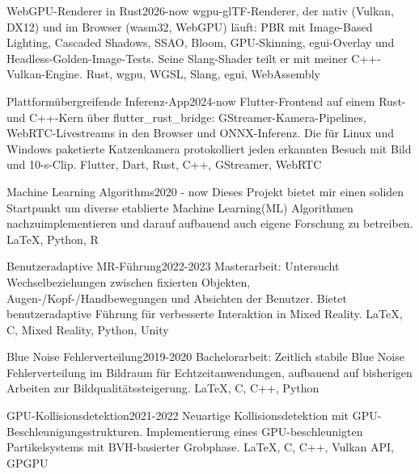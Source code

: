 {\begin{projects}
        \ifcvshowprojwgpu
        \project
     	{WebGPU-Renderer in Rust}{2026-now}
     	{}
     	{wgpu-glTF-Renderer, der nativ (Vulkan, DX12) und im Browser (wasm32, WebGPU) läuft: PBR mit Image-Based Lighting, Cascaded Shadows, SSAO, Bloom, GPU-Skinning, egui-Overlay und Headless-Golden-Image-Tests. Seine Slang-Shader teilt er mit meiner C++-Vulkan-Engine.}
     	{Rust, wgpu, WGSL, Slang, egui, WebAssembly}
        \fi

        \ifcvshowprojomni
        \project
     	{Plattformübergreifende Inferenz-App}{2024-now}
     	{}
     	{Flutter-Frontend auf einem Rust- und C++-Kern über flutter\_rust\_bridge: GStreamer-Kamera-Pipelines, WebRTC-Livestreams in den Browser und ONNX-Inferenz. Die für Linux und Windows paketierte Katzenkamera protokolliert jeden erkannten Besuch mit Bild und 10-s-Clip.}
     	{Flutter, Dart, Rust, C++, GStreamer, WebRTC}
        \fi

        \ifcvshowprojml
     	\project
     	{Machine Learning Algorithms}{2020 - now}
     	{}
     	{Dieses Projekt bietet mir einen soliden Startpunkt um diverse etablierte Machine Learning(ML) Algorithmen nachzuimplementieren und darauf aufbauend auch eigene Forschung zu betreiben.}
     	{\LaTeX, Python, R}
        \fi

        \ifcvshowprojmr
        \project
     	{Benutzeradaptive MR-Führung}{2022-2023}
     	{}
     	{Masterarbeit: Untersucht Wechselbeziehungen zwischen fixierten Objekten, Augen-/Kopf-/Handbewegungen und Absichten der Benutzer. Bietet benutzeradaptive Führung für verbesserte Interaktion in Mixed Reality.}
     	{\LaTeX, C\sharp, Mixed Reality, Python, Unity}
        \fi

        \ifcvshowprojbluenoise
        \project
     	{Blue Noise Fehlerverteilung}{2019-2020}
     	{}
     	{Bachelorarbeit: Zeitlich stabile Blue Noise Fehlerverteilung im Bildraum für Echtzeitanwendungen, aufbauend auf bisherigen Arbeiten zur Bildqualitätssteigerung.}
     	{\LaTeX, C, C++, Python}
        \fi

        \ifcvshowprojcollision
        \project
     	{GPU-Kollisionsdetektion}{2021-2022}
     	{}
     	{Neuartige Kollisionsdetektion mit GPU-Beschleunigungsstrukturen. Implementierung eines GPU-beschleunigten Partikelsystems mit BVH-basierter Grobphase.}
     	{\LaTeX, C, C++, Vulkan API, GPGPU}
        \fi
        
    \end{projects}
}
